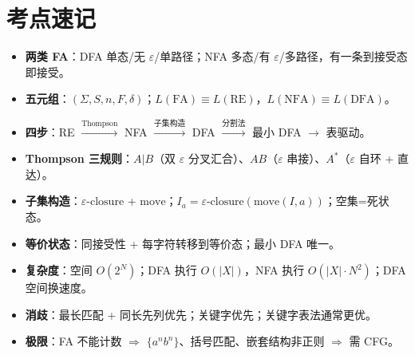 \documentclass[UTF8,fontset=none,11pt]{ctexart}
\newenvironment{notebox}[1][]{%
  \par\medskip\noindent{\color{maincol}\rule{\linewidth}{1.1pt}}\par\nopagebreak
  \noindent{\bfseries\color{maincol}#1}\par\nopagebreak\smallskip}%
  {\par\nopagebreak\smallskip\noindent{\color{maincol}\rule{\linewidth}{0.4pt}}\par\medskip}
\begin{document}
\section*{考点速记}
\begin{notebox}[一页速查]
\begin{itemize}
  \item \textbf{两类 FA}：DFA 单态/无 $\varepsilon$/单路径；NFA 多态/有 $\varepsilon$/多路径，有一条到接受态即接受。
  \item \textbf{五元组}：$(\Sigma,S,n,F,\delta)$；$L(\text{FA})\equiv L(\text{RE})$，$L(\text{NFA})\equiv L(\text{DFA})$。
  \item \textbf{四步}：RE $\xrightarrow{\text{Thompson}}$ NFA $\xrightarrow{\text{子集构造}}$ DFA $\xrightarrow{\text{分割法}}$ 最小 DFA $\to$ 表驱动。
  \item \textbf{Thompson 三规则}：$A|B$（双 $\varepsilon$ 分叉汇合）、$AB$（$\varepsilon$ 串接）、$A^{*}$（$\varepsilon$ 自环 + 直达）。
  \item \textbf{子集构造}：$\varepsilon\text{-closure}$ + $\text{move}$；$I_a=\varepsilon\text{-closure}(\text{move}(I,a))$；空集=死状态。
  \item \textbf{等价状态}：同接受性 + 每字符转移到等价态；最小 DFA 唯一。
  \item \textbf{复杂度}：空间 $O(2^{N})$；DFA 执行 $O(|X|)$，NFA 执行 $O(|X|\cdot N^{2})$；DFA 空间换速度。
  \item \textbf{消歧}：最长匹配 + 同长先列优先；关键字优先；关键字表法通常更优。
  \item \textbf{极限}：FA 不能计数 $\Rightarrow$ $\{a^{n}b^{n}\}$、括号匹配、嵌套结构非正则 $\Rightarrow$ 需 CFG。
\end{itemize}
\end{notebox}
\end{document}
